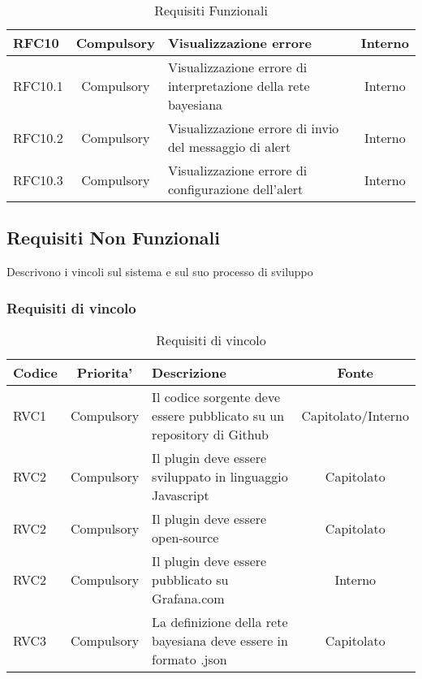 \begin{table}[]
\begin{tabular}{|l|c|p{8cm}|c|}
                \hline
                RFC10 & Compulsory & Visualizzazione errore & Interno\\
                \hline
                RFC10.1 & Compulsory & Visualizzazione errore di interpretazione della rete bayesiana & Interno\\
                \hline
                RFC10.2 & Compulsory & Visualizzazione errore di invio del messaggio di alert & Interno\\
                \hline
                RFC10.3 & Compulsory & Visualizzazione errore di configurazione dell’alert & Interno\\
                \hline
        \end{tabular}
            \caption{Requisiti Funzionali}
            \label{tab:my_label}
        \end{table}
        
        \newpage

        
        \subsection{Requisiti Non Funzionali}
        Descrivono i vincoli sul sistema e sul suo processo di sviluppo
        \subsubsection{Requisiti di vincolo}
        
        \begin{table}[h!]
            \centering
            \renewcommand{\arraystretch}{1.5} %
            \begin{tabular}{|l|c|p{8cm}|c|} %
                \rowcolor{orange!50} %
        		\hline
        		\textbf{Codice} & \textbf{Priorita'} & \textbf{Descrizione} & \textbf{Fonte}\\
                \hline
                RVC1 &  Compulsory & Il codice sorgente deve essere pubblicato su un repository di Github & Capitolato/Interno\\
                \hline
                RVC2 & Compulsory & Il plugin deve essere sviluppato in linguaggio Javascript & Capitolato\\
                \hline
                RVC2 & Compulsory & Il plugin deve essere open-source & Capitolato\\
                \hline
                RVC2 & Compulsory & Il plugin deve essere pubblicato su Grafana.com & Interno\\
                \hline
                RVC3 & Compulsory & La definizione della rete bayesiana deve essere in formato .json & Capitolato\\
                \hline
            \end{tabular}
            \caption{Requisiti di vincolo} %
            \label{tab:my_label}
        \end{table}
        
